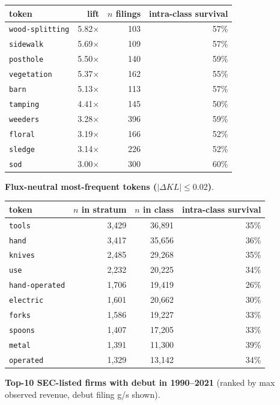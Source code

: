 \begin{tabular}{lrrr}
\toprule
token & lift & $n$ filings & intra-class survival \\
\midrule
\texttt{wood-splitting} & 5.82$\times$ & 103 & 57\% \\
\texttt{sidewalk} & 5.69$\times$ & 109 & 57\% \\
\texttt{posthole} & 5.50$\times$ & 140 & 59\% \\
\texttt{vegetation} & 5.37$\times$ & 162 & 55\% \\
\texttt{barn} & 5.13$\times$ & 113 & 57\% \\
\texttt{tamping} & 4.41$\times$ & 145 & 50\% \\
\texttt{weeders} & 3.28$\times$ & 396 & 59\% \\
\texttt{floral} & 3.19$\times$ & 166 & 52\% \\
\texttt{sledge} & 3.14$\times$ & 226 & 52\% \\
\texttt{sod} & 3.00$\times$ & 300 & 60\% \\
\bottomrule
\end{tabular}

\textbf{Flux-neutral most-frequent tokens ($|\Delta KL|\leq 0.02$)}.

\begin{tabular}{lrrr}
\toprule
token & $n$ in stratum & $n$ in class & intra-class survival \\
\midrule
\texttt{tools} & 3,429 & 36,891 & 35\% \\
\texttt{hand} & 3,417 & 35,656 & 36\% \\
\texttt{knives} & 2,485 & 29,268 & 35\% \\
\texttt{use} & 2,232 & 20,225 & 34\% \\
\texttt{hand-operated} & 1,706 & 19,419 & 26\% \\
\texttt{electric} & 1,601 & 20,662 & 30\% \\
\texttt{forks} & 1,586 & 19,227 & 33\% \\
\texttt{spoons} & 1,407 & 17,205 & 33\% \\
\texttt{metal} & 1,391 & 11,300 & 39\% \\
\texttt{operated} & 1,329 & 13,142 & 34\% \\
\bottomrule
\end{tabular}

\textbf{Top-10 SEC-listed firms with debut in 1990--2021} (ranked by max observed revenue, debut filing g/s shown).

